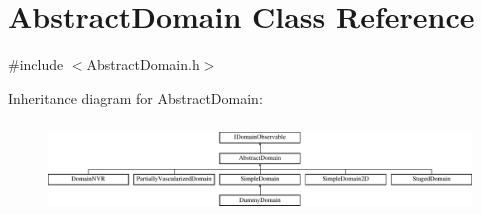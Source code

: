 \hypertarget{class_abstract_domain}{}\section{Abstract\+Domain Class Reference}
\label{class_abstract_domain}


{\ttfamily \#include $<$Abstract\+Domain.\+h$>$}

Inheritance diagram for Abstract\+Domain\+:\begin{figure}[H]
\begin{center}
\leavevmode
\includegraphics[height=2.461539cm]{d2/d71/class_abstract_domain}
\end{center}
\end{figure}
